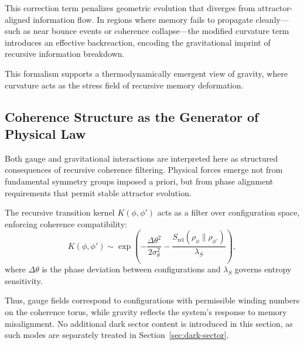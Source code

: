 This correction term penalizes geometric evolution that diverges from attractor-aligned information flow. In regions where memory fails to propagate cleanly—such as near bounce events or coherence collapse—the modified curvature term introduces an effective backreaction, encoding the gravitational imprint of recursive information breakdown.

This formalism supports a thermodynamically emergent view of gravity, where curvature acts as the stress field of recursive memory deformation.

\subsection{Coherence Structure as the Generator of Physical Law}

Both gauge and gravitational interactions are interpreted here as structured consequences of recursive coherence filtering. Physical forces emerge not from fundamental symmetry groups imposed a priori, but from phase alignment requirements that permit stable attractor evolution.

The recursive transition kernel \( K(\phi, \phi') \) acts as a filter over configuration space, enforcing coherence compatibility:
\[
K(\phi, \phi') \sim \exp\left( -\frac{\Delta \theta^2}{2\sigma_\theta^2} - \frac{S_{\text{rel}}(\rho_\phi \| \rho_{\phi'})}{\lambda_S} \right),
\]
where \( \Delta \theta \) is the phase deviation between configurations and \( \lambda_S \) governs entropy sensitivity.

Thus, gauge fields correspond to configurations with permissible winding numbers on the coherence torus, while gravity reflects the system’s response to memory misalignment. No additional dark sector content is introduced in this section, as such modes are separately treated in Section~\ref{sec:dark-sector}.
